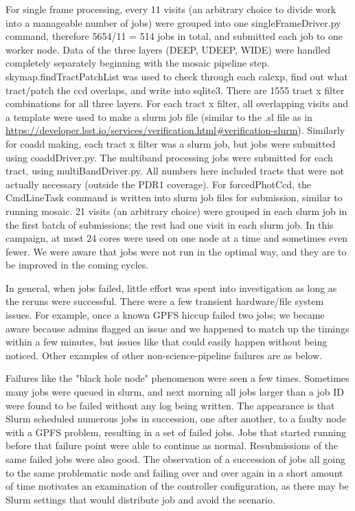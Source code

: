 \documentclass[DM,authoryear,toc]{lsstdoc}
\begin{document}
For single frame processing, every 11 visits (an arbitrary choice to divide work into a manageable number of jobs) were grouped into one singleFrameDriver.py command, therefore 5654/11 = 514 jobs in total, and submitted each job to one worker node.  Data of the three layers (DEEP, UDEEP, WIDE) were handled completely separately beginning with the mosaic pipeline step.  skymap.findTractPatchList was used to check through each calexp, find out what tract/patch the ccd overlaps, and write into sqlite3. There are 1555 tract x filter combinations for all three layers. For each tract x filter, all overlapping visits and a template were used to make a slurm job file (similar to the .sl file as in \url{https://developer.lsst.io/services/verification.html#verification-slurm}). Similarly for coadd making, each tract x filter was a slurm job, but jobs were submitted using coaddDriver.py.  The multiband processing jobs were submitted for each tract, using multiBandDriver.py.   All numbers here included tracts that were not actually necessary (outside the PDR1 coverage).  For forcedPhotCcd, the CmdLineTask command is written into slurm job files for submission, similar to running mosaic. 21 visits (an arbitrary choice) were grouped in each slurm job in the first batch of submissions; the rest had one visit in each slurm job. In this campaign, at most 24 cores were used on one node at a time and sometimes even fewer.   We were aware that jobs were not run in the optimal way, and they are to be improved in the coming cycles.

In general, when jobs failed, little effort was spent into investigation as long as the reruns were successful. There were a few transient hardware/file system issues. For example, once a known GPFS hiccup failed two jobs;
we became aware because admins flagged an issue and we happened to match up the timings within a few minutes, but issues like that could easily happen without being noticed.
Other examples of other non-science-pipeline failures are as below.

Failures like the "black hole node" phenomenon were seen a few times. Sometimes many jobs were queued in slurm, and next morning all jobs larger than a job ID were found to be failed without any log being written.  The appearance is that Slurm scheduled numerous jobs in succession, one after another, to a faulty node with a GPFS problem, resulting in a set of failed jobs.   Jobs that started running before that failure point were able to continue as normal. Resubmissions of the same failed jobs were also good.   The observation of a succession of jobs all going to the same problematic node and failing over and over again in a short amount of time motivates an examination of the controller configuration, as there may be Slurm settings that would distribute job and avoid the scenario.
\end{document}
